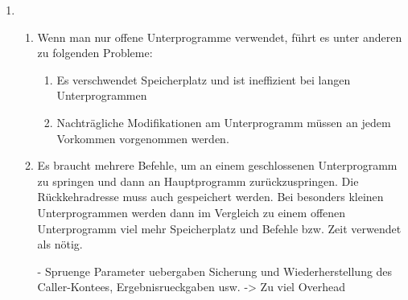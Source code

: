 \begin{enumerate}[label={Aufgabe H\arabic*},start=4]
	\item 
	\begin{enumerate}[label={\alph*.}]
	    \item Wenn man nur offene Unterprogramme verwendet, führt es unter anderen zu folgenden Probleme:
	        \begin{enumerate}[label={(\roman*)}]
	            \item Es verschwendet Speicherplatz und ist ineffizient bei langen Unterprogrammen




	            \item Nachträgliche Modifikationen am Unterprogramm müssen an jedem Vorkommen vorgenommen werden.
	        \end{enumerate}
	    \item Es braucht mehrere Befehle, um an einem geschlossenen Unterprogramm zu springen und dann an Hauptprogramm zurückzuspringen. Die Rückkehradresse muss auch gespeichert werden. Bei besonders kleinen Unterprogrammen werden dann im Vergleich zu einem offenen Unterprogramm viel mehr Speicherplatz und Befehle bzw. Zeit verwendet als nötig.

	    - Spruenge
	    Parameter uebergaben
	    Sicherung und Wiederherstellung des Caller-Kontees,
	    Ergebnisrueckgaben usw.
	    -> Zu viel Overhead


\end{enumerate}
\end{enumerate}
